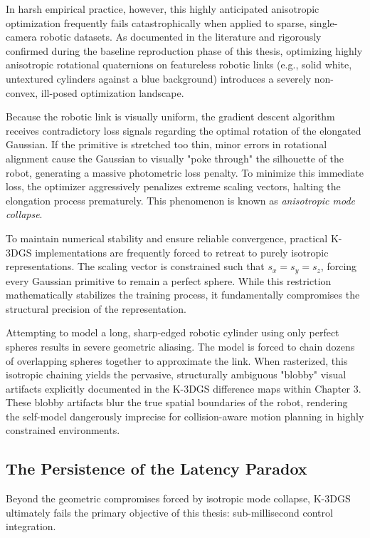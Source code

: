 \documentclass[12pt,a4paper,oneside]{report}
\begin{document}
In harsh empirical practice, however, this highly anticipated anisotropic optimization frequently fails catastrophically when applied to sparse, single-camera robotic datasets. As documented in the literature and rigorously confirmed during the baseline reproduction phase of this thesis, optimizing highly anisotropic rotational quaternions on featureless robotic links (e.g., solid white, untextured cylinders against a blue background) introduces a severely non-convex, ill-posed optimization landscape.

Because the robotic link is visually uniform, the gradient descent algorithm receives contradictory loss signals regarding the optimal rotation of the elongated Gaussian. If the primitive is stretched too thin, minor errors in rotational alignment cause the Gaussian to visually "poke through" the silhouette of the robot, generating a massive photometric loss penalty. To minimize this immediate loss, the optimizer aggressively penalizes extreme scaling vectors, halting the elongation process prematurely. This phenomenon is known as \textit{anisotropic mode collapse}.

To maintain numerical stability and ensure reliable convergence, practical K-3DGS implementations are frequently forced to retreat to purely isotropic representations. The scaling vector is constrained such that $s_x = s_y = s_z$, forcing every Gaussian primitive to remain a perfect sphere. While this restriction mathematically stabilizes the training process, it fundamentally compromises the structural precision of the representation. 

Attempting to model a long, sharp-edged robotic cylinder using only perfect spheres results in severe geometric aliasing. The model is forced to chain dozens of overlapping spheres together to approximate the link. When rasterized, this isotropic chaining yields the pervasive, structurally ambiguous "blobby" visual artifacts explicitly documented in the K-3DGS difference maps within Chapter 3. These blobby artifacts blur the true spatial boundaries of the robot, rendering the self-model dangerously imprecise for collision-aware motion planning in highly constrained environments.

\subsection{The Persistence of the Latency Paradox}

Beyond the geometric compromises forced by isotropic mode collapse, K-3DGS ultimately fails the primary objective of this thesis: sub-millisecond control integration. 
\end{document}
